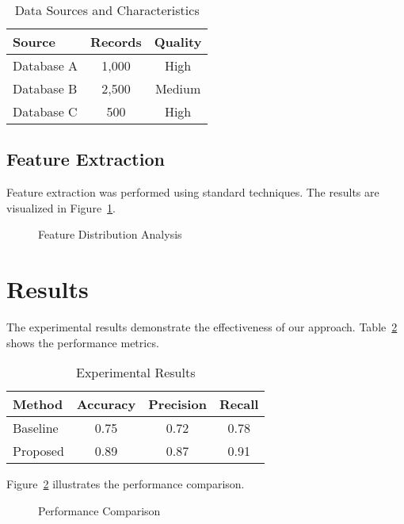 \documentclass{article}
\begin{document}
\begin{table}[h]
\centering
\caption{Data Sources and Characteristics}
\label{tab:data_sources}
\begin{tabular}{|l|c|c|}
\hline
Source & Records & Quality \\
\hline
Database A & 1,000 & High \\
Database B & 2,500 & Medium \\
Database C & 500 & High \\
\hline
\end{tabular}
\end{table}

\subsection{Feature Extraction}
\label{subsec:features}

Feature extraction was performed using standard techniques. The results are visualized in Figure~\ref{fig:features}.

\begin{figure}[h]
\centering
\caption{Feature Distribution Analysis}
\label{fig:features}
\end{figure}

\section{Results}
\label{sec:results}

The experimental results demonstrate the effectiveness of our approach. Table~\ref{tab:results} shows the performance metrics.

\begin{table}[h]
\centering
\caption{Experimental Results}
\label{tab:results}
\begin{tabular}{|l|c|c|c|}
\hline
Method & Accuracy & Precision & Recall \\
\hline
Baseline & 0.75 & 0.72 & 0.78 \\
Proposed & 0.89 & 0.87 & 0.91 \\
\hline
\end{tabular}
\end{table}

Figure~\ref{fig:results} illustrates the performance comparison.

\begin{figure}[h]
\centering
\caption{Performance Comparison}
\label{fig:results}
\end{figure}
\end{document}
